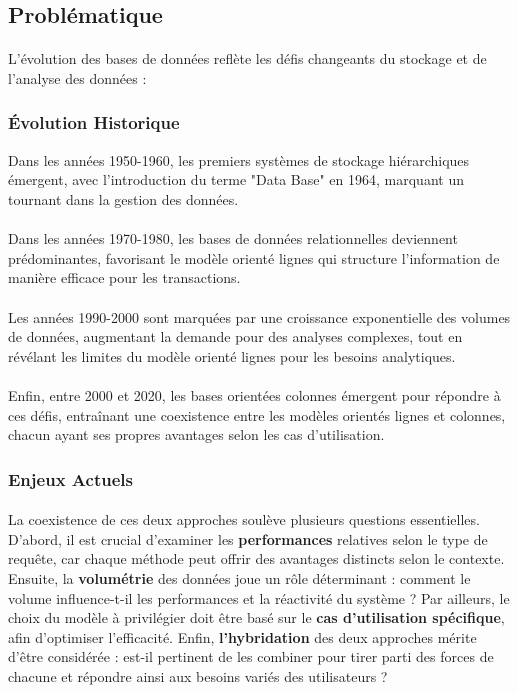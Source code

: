 \documentclass[11pt]{extarticle}
\begin{document}
\subsection{Problématique}
\paragraph{}
L'évolution des bases de données reflète les défis changeants du stockage et de l'analyse des données :

\subsubsection{Évolution Historique}

Dans les années 1950-1960, les premiers systèmes de stockage hiérarchiques émergent, avec l'introduction du terme "Data Base" en 1964, marquant un tournant dans la gestion des données. 
\paragraph{} Dans les années 1970-1980, les bases de données relationnelles deviennent prédominantes, favorisant le modèle orienté lignes qui structure l’information de manière efficace pour les transactions. 
\paragraph{} Les années 1990-2000 sont marquées par une croissance exponentielle des volumes de données, augmentant la demande pour des analyses complexes, tout en révélant les limites du modèle orienté lignes pour les besoins analytiques. 
\paragraph{} Enfin, entre 2000 et 2020, les bases orientées colonnes émergent pour répondre à ces défis, entraînant une coexistence entre les modèles orientés lignes et colonnes, chacun ayant ses propres avantages selon les cas d'utilisation.


\subsubsection{Enjeux Actuels}
\paragraph{}
La coexistence de ces deux approches soulève plusieurs questions essentielles. D'abord, il est crucial d'examiner les \textbf{performances} relatives selon le type de requête, car chaque méthode peut offrir des avantages distincts selon le contexte. Ensuite, la \textbf{volumétrie} des données joue un rôle déterminant : comment le volume influence-t-il les performances et la réactivité du système ?  Par ailleurs, le choix du modèle à privilégier doit être basé sur le \textbf{cas d'utilisation spécifique}, afin d'optimiser l'efficacité. Enfin, \textbf{l'hybridation} des deux approches mérite d'être considérée : est-il pertinent de les combiner pour tirer parti des forces de chacune et répondre ainsi aux besoins variés des utilisateurs ?
\end{document}
